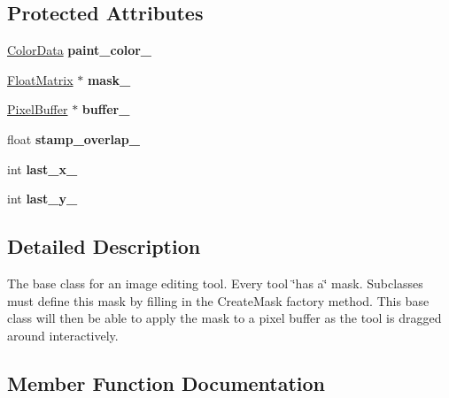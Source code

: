 \subsection*{Protected Attributes}
\begin{DoxyCompactItemize}
\item 
\mbox{\label{classimage__tools_1_1Tool_aaf889880acec7512b12e86ebdbeb3beb}} 
\hyperlink{classimage__tools_1_1ColorData}{Color\+Data} {\bfseries paint\+\_\+color\+\_\+}
\item 
\mbox{\label{classimage__tools_1_1Tool_a23a45a40d69356c9b67ae4302804c28b}} 
\hyperlink{classimage__tools_1_1FloatMatrix}{Float\+Matrix} $\ast$ {\bfseries mask\+\_\+}
\item 
\mbox{\label{classimage__tools_1_1Tool_af23788bccb2badbcd03dafeb2b4afb3b}} 
\hyperlink{classimage__tools_1_1PixelBuffer}{Pixel\+Buffer} $\ast$ {\bfseries buffer\+\_\+}
\item 
\mbox{\label{classimage__tools_1_1Tool_a18f054c5448762db3b1e80bfd7b17510}} 
float {\bfseries stamp\+\_\+overlap\+\_\+}
\item 
\mbox{\label{classimage__tools_1_1Tool_ac8354e7948afc34f1a8a85a56a047b76}} 
int {\bfseries last\+\_\+x\+\_\+}
\item 
\mbox{\label{classimage__tools_1_1Tool_a52559a69433d2b4665cd3309751d91ad}} 
int {\bfseries last\+\_\+y\+\_\+}
\end{DoxyCompactItemize}


\subsection{Detailed Description}
The base class for an image editing tool. Every tool \char`\"{}has a\char`\"{} mask. Subclasses must define this mask by filling in the Create\+Mask factory method. This base class will then be able to apply the mask to a pixel buffer as the tool is dragged around interactively. 

\subsection{Member Function Documentation}
\mbox{\label{classimage__tools_1_1Tool_a84d87d7baec8a961be236d4b30636fc0}} 
